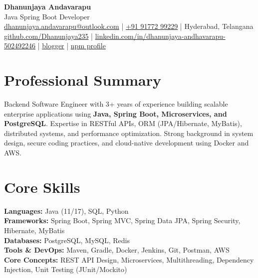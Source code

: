 \documentclass[11pt]{article}
\begin{document}
\begin{center}
    {\LARGE \textbf{Dhanunjaya Andavarapu}}\\
    \vspace{4pt}
    Java Spring Boot Developer\\
    \vspace{4pt}
    \href{mailto:dhanunjaya.andavarapu@outlook.com}{dhanunjaya.andavarapu@outlook.com} \quad | \quad
    \href{tel:+919177299229}{+91 91772 99229} \quad | \quad
    Hyderabad, Telangana\\
    \vspace{4pt}
    \href{https://github.com/Dhanunjaya235}{github.com/Dhanunjaya235} \quad | \quad
    \href{https://www.linkedin.com/in/dhanunjaya-andhavarapu-502492246}{linkedin.com/in/dhanunjaya-andhavarapu-502492246} \quad | \quad
    \href{https://www.blogger.com/blog/pages/2357939272283650645}{blogger} \quad | \quad
    \href{https://www.npmjs.com/settings/dhanunjay/packages}{npm profile}
\end{center}

\section*{Professional Summary}
Backend Software Engineer with 3+ years of experience building scalable enterprise applications using \textbf{Java, Spring Boot, Microservices, and PostgreSQL}. Expertise in RESTful APIs, ORM (JPA/Hibernate, MyBatis), distributed systems, and performance optimization. Strong background in system design, secure coding practices, and cloud-native development using Docker and AWS.

\section*{Core Skills}
\textbf{Languages:} Java (11/17), SQL, Python \\
\textbf{Frameworks:} Spring Boot, Spring MVC, Spring Data JPA, Spring Security, Hibernate, MyBatis \\
\textbf{Databases:} PostgreSQL, MySQL, Redis \\
\textbf{Tools & DevOps:} Maven, Gradle, Docker, Jenkins, Git, Postman, AWS \\
\textbf{Core Concepts:} REST API Design, Microservices, Multithreading, Dependency Injection, Unit Testing (JUnit/Mockito)
\end{document}
